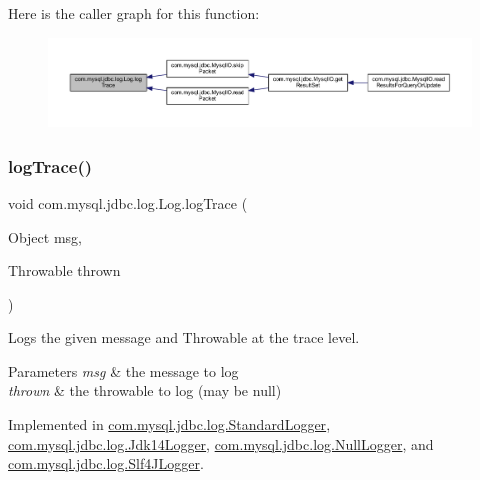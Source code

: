 Here is the caller graph for this function\+:
\nopagebreak
\begin{figure}[H]
\begin{center}
\leavevmode
\includegraphics[width=350pt]{interfacecom_1_1mysql_1_1jdbc_1_1log_1_1_log_a8946382e4cf99819a43cdb3783fd0ee3_icgraph}
\end{center}
\end{figure}
\mbox{\label{interfacecom_1_1mysql_1_1jdbc_1_1log_1_1_log_a99ab17ccd9795acda736a284d9e32024}} 
\subsubsection{\texorpdfstring{log\+Trace()}{logTrace()}\hspace{0.1cm}{\footnotesize\ttfamily [2/2]}}
{\footnotesize\ttfamily void com.\+mysql.\+jdbc.\+log.\+Log.\+log\+Trace (\begin{DoxyParamCaption}\item[{Object}]{msg,  }\item[{Throwable}]{thrown }\end{DoxyParamCaption})}

Logs the given message and Throwable at the \textquotesingle{}trace\textquotesingle{} level.


\begin{DoxyParams}{Parameters}
{\em msg} & the message to log \\
\hline
{\em thrown} & the throwable to log (may be null) \\
\hline
\end{DoxyParams}


Implemented in \mbox{\hyperlink{classcom_1_1mysql_1_1jdbc_1_1log_1_1_standard_logger_a5e5a12d72648c2316f561808a2d1410a}{com.\+mysql.\+jdbc.\+log.\+Standard\+Logger}}, \mbox{\hyperlink{classcom_1_1mysql_1_1jdbc_1_1log_1_1_jdk14_logger_a9dd684e245ffdef5262bdd185171f773}{com.\+mysql.\+jdbc.\+log.\+Jdk14\+Logger}}, \mbox{\hyperlink{classcom_1_1mysql_1_1jdbc_1_1log_1_1_null_logger_a5c6f91128dff5836650a7dbfea43ddf2}{com.\+mysql.\+jdbc.\+log.\+Null\+Logger}}, and \mbox{\hyperlink{classcom_1_1mysql_1_1jdbc_1_1log_1_1_slf4_j_logger_ac0e1bf43fefe1495aba1042cf46c1e0c}{com.\+mysql.\+jdbc.\+log.\+Slf4\+J\+Logger}}.

